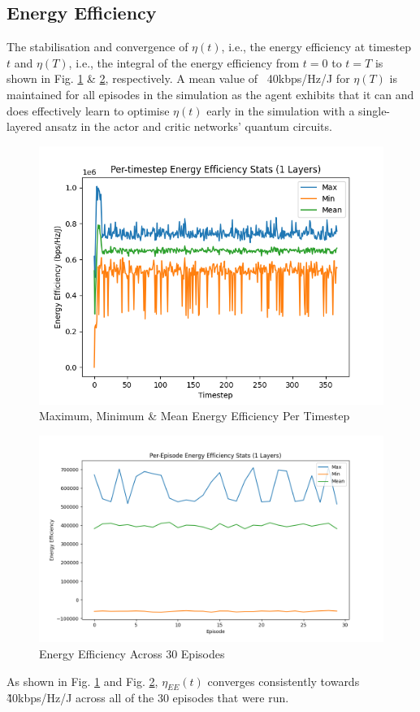 \subsection{Energy Efficiency}
The stabilisation and convergence of $\eta(t)$, i.e., the energy efficiency at timestep $t$ and $\eta (T)$, i.e., the integral of the energy efficiency from $t=0$ to $t=T$ is shown in Fig. \ref{fig:step_energy_eff} \& \ref{fig:ep_energy_eff}, respectively. 
A mean value of ~40kbps/Hz/J for $\eta(T)$ is maintained for all episodes in the simulation as the agent exhibits that it can and does effectively learn to optimise $\eta(t)$ early in the simulation with a single-layered ansatz in the actor and critic networks' quantum circuits. 
\begin{figure} [ht!]
    \centering
    \includegraphics[width=0.75\linewidth]{figures/plots_eve_outputs/test3/1_timestep_energy_eff.png}
    \caption{Maximum, Minimum \& Mean Energy Efficiency Per Timestep}
    \label{fig:step_energy_eff}
\end{figure}

\begin{figure} [ht!]
    \centering
    \includegraphics[width=0.75\linewidth]{figures/test9/1_episode_energy_eff.png}
    \caption{Energy Efficiency Across 30 Episodes}
    \label{fig:ep_energy_eff}
\end{figure}
As shown in Fig. \ref{fig:step_energy_eff} and Fig. \ref{fig:ep_energy_eff}, $\eta_{EE} (t)$ converges consistently towards \~ 40kbps/Hz/J across all of the 30 episodes that were run. 

